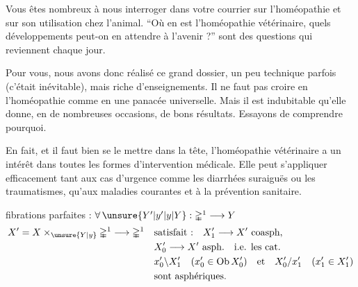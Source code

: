 Vous êtes nombreux à nous interroger dans votre
courrier sur l'homéopathie et sur son utilisation chez
l'animal. ``Où en est l'homéopathie vétérinaire, quels
développements peut-on en attendre à l'avenir ?'' sont
des questions qui reviennent chaque jour.

Pour vous, nous avons donc réalisé ce grand dossier, un peu technique parfois (c'était inévitable), mais
riche d'enseignements. Il ne faut pas croire en l'homéopathie comme en une panacée universelle. Mais il est
indubitable qu'elle donne, en de nombreuses occasions, de bons résultats. Essayons de comprendre
pourquoi.




En fait, et il faut bien se le
mettre dans la tête, l'homéopathie vétérinaire a un intérêt dans toutes les formes
d'intervention médicale. Elle
peut s'appliquer efficacement tant aux cas d'urgence
comme les diarrhées suraiguës ou les traumatismes,
qu'aux maladies courantes
et à la prévention sanitaire.



 fibrations parfaites : $\forall\,\unsure{Y'|y'|y|Y}:\mathbb{\Delta}^1\longrightarrow Y$ 
\[
\begin{aligned}
X'=X\times_{\unsure{Y|y}}\mathbb{\Delta}^1\longrightarrow\mathbb{\Delta}^1\quad &\text{satisfait :}\quad X'_1\longrightarrow X'\ \text{coasph},\\
&X'_0\longrightarrow X'\ \text{asph.}\quad\text{i.e. les cat.}\\
&x'_0\backslash X'_1\quad(x'_0\in\mathrm{Ob}\,X'_0)\quad\text{et}\quad X'_0/x'_1\quad(x'_1\in X'_1)\\
&\text{sont asphériques.}
\end{aligned}
\]

